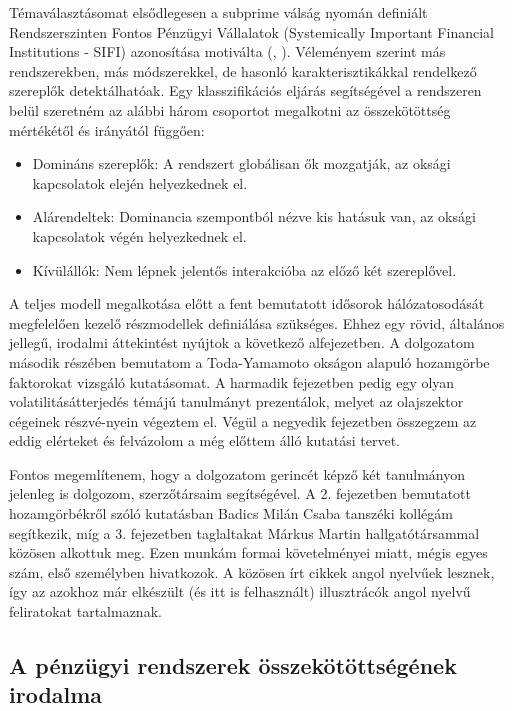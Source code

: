 \documentclass[12pt,bibliography=totoc]{article}
\begin{document}


Témaválasztásomat elsődlegesen a subprime válság nyomán definiált Rendszerszinten Fontos Pénzügyi Vállalatok (Systemically Important Financial Institutions - SIFI) azonosítása motiválta (\cite{moenninghoff2015perennial}, \cite{ lines2010reducing}). Véleményem szerint más rendszerekben, más módszerekkel, de hasonló karakterisztikákkal rendelkező szereplők detektálhatóak. Egy klasszifikációs eljárás segítségével a rendszeren belül szeretném az alábbi három csoportot megalkotni az összekötöttség mértékétől és irányától függően:

\begin{itemize}
\item Domináns szereplők: A rendszert globálisan ők mozgatják, az oksági kapcsolatok elején helyezkednek el.
\item Alárendeltek: Dominancia szempontból nézve kis hatásuk van, az oksági kapcsolatok végén helyezkednek el.
\item Kívülállók: Nem lépnek jelentős interakcióba az előző két szereplővel.
\end{itemize}

A teljes modell megalkotása előtt a fent bemutatott idősorok hálózatosodását megfelelően kezelő részmodellek definiálása szükséges. Ehhez egy rövid, általános jellegű, irodalmi áttekintést nyújtok a következő alfejezetben.  A dolgozatom második részében bemutatom a Toda-Yamamoto okságon alapuló hozamgörbe faktorokat vizsgáló kutatásomat. A harmadik fejezetben pedig egy olyan volatilitásátterjedés témájú tanulmányt prezentálok, melyet az olajszektor cégeinek részvé-nyein végeztem el. Végül a negyedik fejezetben összegzem az eddig elérteket és felvázolom a még előttem álló kutatási tervet.

Fontos megemlítenem, hogy a dolgozatom gerincét képző két tanulmányon jelenleg is dolgozom, szerzőtársaim segítségével. A 2. fejezetben bemutatott hozamgörbékről szóló kutatásban Badics Milán Csaba tanszéki kollégám segítkezik, míg a 3. fejezetben taglaltakat Márkus Martin hallgatótársammal közösen alkottuk meg. Ezen munkám formai követelményei miatt, mégis egyes szám, első személyben hivatkozok. A közösen írt cikkek angol nyelvűek lesznek, így az azokhoz már elkészült (és itt is felhasznált) illusztrácók angol nyelvű feliratokat tartalmaznak.

\subsection{A pénzügyi rendszerek összekötöttségének irodalma}
\end{document}
